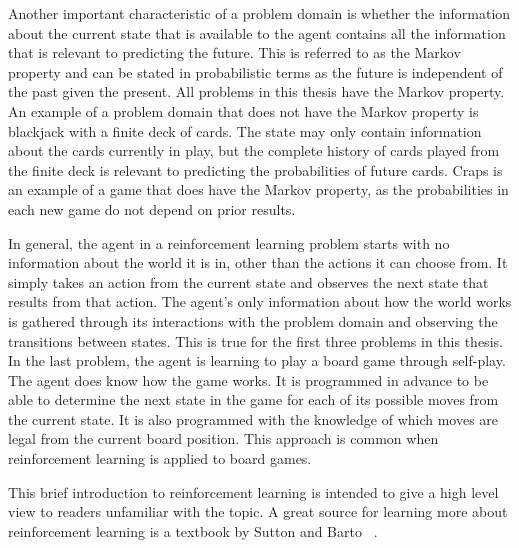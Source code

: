 Another important characteristic of a problem domain is whether the information about the current state that is available to the agent contains all the information that is relevant to predicting the future.  This is referred to as the Markov property and can be stated in probabilistic terms as the future is independent of the past given the present.  All problems in this thesis have the Markov property.  An example of a problem domain that does not have the Markov property is blackjack with a finite deck of cards.  The state may only contain information about the cards currently in play, but the complete history of cards played from the finite deck is relevant to predicting the probabilities of future cards.  Craps is an example of a game that does have the Markov property, as the probabilities in each new game do not depend on prior results.

In general, the agent in a reinforcement learning problem starts with no information about the world it is in, other than the actions it can choose from.  It simply takes an action from the current state and observes the next state that results from that action.  The agent’s only information about how the world works is gathered through its interactions with the problem domain and observing the transitions between states.  This is true for the first three problems in this thesis.  In the last problem, the agent is learning to play a board game through self-play.  The agent does know how the game works.  It is programmed in advance to be able to determine the next state in the game for each of its possible moves from the current state.  It is also programmed with the knowledge of which moves are legal from the current board position.  This approach is common when reinforcement learning is applied to board games.

This brief introduction to reinforcement learning is intended to give a high level view to readers unfamiliar with the topic.  A great source for learning more about reinforcement learning is a textbook by Sutton and Barto ~\cite{Sutton:1998p3536}.
